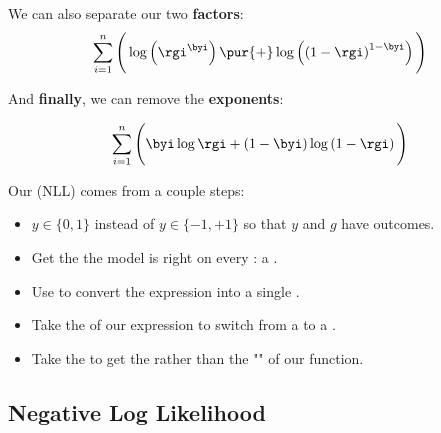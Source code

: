         We can also separate our two \textbf{factors}:
        \begin{equation}
            \sum_{i = 1}^n
            \Bigg(
                \log\left(
                        \rgi ^{\byi}
                \right)
                \pur{+}
                \log\left( 
                    \left(  1 - \rgi  \right)
                    ^ { 1 - \byi }
                \right) 
            \Bigg)
        \end{equation}
        
        And \textbf{finally}, we can remove the \textbf{exponents}:
        
        \begin{equation}
            \sum_{i = 1}^n
            \Bigg(
                \byi\log{\rgi}
                +
                \left( 1 - \byi \right)
                \log
                    \left( 1 - \rgi \right) 
            \Bigg)
        \end{equation}
    
        \begin{concept}
            Our  (NLL) comes from a couple steps:
            
            \begin{itemize}
                \item {} $y \in \{0, 1\}$ instead of $y \in \{-1,+1\}$ so that $y$ and $g$ have  outcomes.
            
                \item Get the  the model is right on every : a .
                
                \item Use  to convert the  expression into a single .
                
                \item Take the  of our expression to switch from a  to a .
                
                \item Take the  to get the  rather than the "" of our function.
            \end{itemize}
        \end{concept}    
        
    \subsection{Negative Log Likelihood}
    
